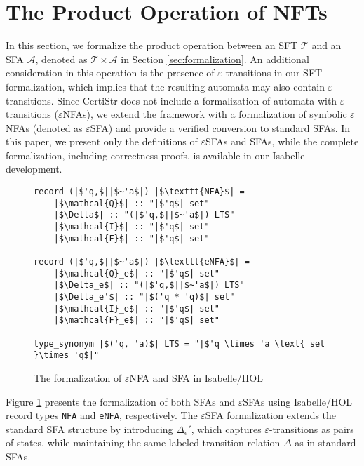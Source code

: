 \documentclass[a4paper,UKenglish,cleveref, autoref, anonymous, thm-restate]{lipics-v2021}
\begin{document}

\section{The Product Operation of NFTs}
\label{sec:product-operation}

In this section, we formalize the product operation between an SFT $\mathcal{T}$ and an SFA $\mathcal{A}$, denoted as $\mathcal{T} \times \mathcal{A}$ in Section \ref{sec:formalization}. An additional consideration in this operation is the presence of $\varepsilon$-transitions in our SFT formalization, which implies that the resulting automata may also contain $\varepsilon$-transitions. Since CertiStr \cite{cpp/KanLRS22} does not include a formalization of automata with $\varepsilon$-transitions ($\varepsilon$NFAs), we extend the framework with a formalization of symbolic $\varepsilon$NFAs (denoted as $\varepsilon$SFA) and provide a verified conversion to standard SFAs. In this paper, we present only the definitions of  $\varepsilon$SFAs and SFAs, while the complete formalization, including correctness proofs, is available in our Isabelle development.

\begin{figure}[hbt!]
	\begin{lstlisting}
record (|$'q,$||$~'a$|) |$\texttt{NFA}$| =
	|$\mathcal{Q}$| :: "|$'q$| set"
	|$\Delta$| :: "(|$'q,$||$~'a$|) LTS"
	|$\mathcal{I}$| :: "|$'q$| set"
	|$\mathcal{F}$| :: "|$'q$| set"

record (|$'q,$||$~'a$|) |$\texttt{eNFA}$| =
	|$\mathcal{Q}_e$| :: "|$'q$| set"
	|$\Delta_e$| :: "(|$'q,$||$~'a$|) LTS"
	|$\Delta_e'$| :: "|$('q * 'q)$| set"
	|$\mathcal{I}_e$| :: "|$'q$| set"
	|$\mathcal{F}_e$| :: "|$'q$| set"

type_synonym |$('q, 'a)$| LTS = "|$'q \times 'a \text{ set }\times 'q$|"    
	\end{lstlisting}
\caption{The formalization of $\varepsilon$NFA and SFA in Isabelle/HOL}
\label{fig-def-FAs}
\end{figure}

Figure \ref{fig-def-FAs} presents the formalization of both SFAs and $\varepsilon$SFAs using Isabelle/HOL record types \texttt{NFA} and \texttt{eNFA}, respectively. The $\varepsilon$SFA formalization extends the standard SFA structure by introducing $\Delta_e'$, which captures $\varepsilon$-transitions as pairs of states, while maintaining the same labeled transition relation $\Delta$ as in standard SFAs.
\end{document}
